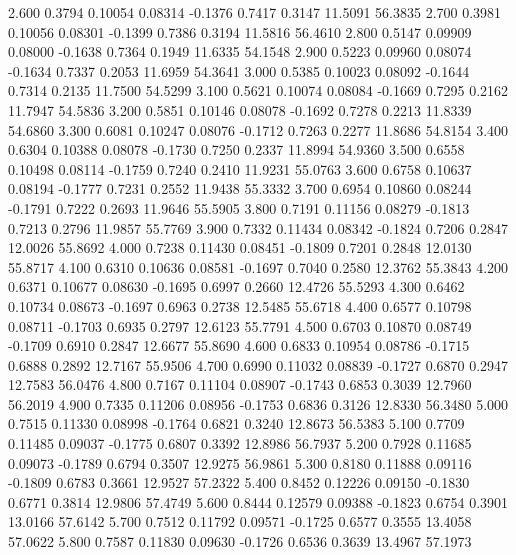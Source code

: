    2.600   0.3794   0.10054   0.08314  -0.1376   0.7417   0.3147  11.5091  56.3835
   2.700   0.3981   0.10056   0.08301  -0.1399   0.7386   0.3194  11.5816  56.4610
   2.800   0.5147   0.09909   0.08000  -0.1638   0.7364   0.1949  11.6335  54.1548
   2.900   0.5223   0.09960   0.08074  -0.1634   0.7337   0.2053  11.6959  54.3641
   3.000   0.5385   0.10023   0.08092  -0.1644   0.7314   0.2135  11.7500  54.5299
   3.100   0.5621   0.10074   0.08084  -0.1669   0.7295   0.2162  11.7947  54.5836
   3.200   0.5851   0.10146   0.08078  -0.1692   0.7278   0.2213  11.8339  54.6860
   3.300   0.6081   0.10247   0.08076  -0.1712   0.7263   0.2277  11.8686  54.8154
   3.400   0.6304   0.10388   0.08078  -0.1730   0.7250   0.2337  11.8994  54.9360
   3.500   0.6558   0.10498   0.08114  -0.1759   0.7240   0.2410  11.9231  55.0763
   3.600   0.6758   0.10637   0.08194  -0.1777   0.7231   0.2552  11.9438  55.3332
   3.700   0.6954   0.10860   0.08244  -0.1791   0.7222   0.2693  11.9646  55.5905
   3.800   0.7191   0.11156   0.08279  -0.1813   0.7213   0.2796  11.9857  55.7769
   3.900   0.7332   0.11434   0.08342  -0.1824   0.7206   0.2847  12.0026  55.8692
   4.000   0.7238   0.11430   0.08451  -0.1809   0.7201   0.2848  12.0130  55.8717
   4.100   0.6310   0.10636   0.08581  -0.1697   0.7040   0.2580  12.3762  55.3843
   4.200   0.6371   0.10677   0.08630  -0.1695   0.6997   0.2660  12.4726  55.5293
   4.300   0.6462   0.10734   0.08673  -0.1697   0.6963   0.2738  12.5485  55.6718
   4.400   0.6577   0.10798   0.08711  -0.1703   0.6935   0.2797  12.6123  55.7791
   4.500   0.6703   0.10870   0.08749  -0.1709   0.6910   0.2847  12.6677  55.8690
   4.600   0.6833   0.10954   0.08786  -0.1715   0.6888   0.2892  12.7167  55.9506
   4.700   0.6990   0.11032   0.08839  -0.1727   0.6870   0.2947  12.7583  56.0476
   4.800   0.7167   0.11104   0.08907  -0.1743   0.6853   0.3039  12.7960  56.2019
   4.900   0.7335   0.11206   0.08956  -0.1753   0.6836   0.3126  12.8330  56.3480
   5.000   0.7515   0.11330   0.08998  -0.1764   0.6821   0.3240  12.8673  56.5383
   5.100   0.7709   0.11485   0.09037  -0.1775   0.6807   0.3392  12.8986  56.7937
   5.200   0.7928   0.11685   0.09073  -0.1789   0.6794   0.3507  12.9275  56.9861
   5.300   0.8180   0.11888   0.09116  -0.1809   0.6783   0.3661  12.9527  57.2322
   5.400   0.8452   0.12226   0.09150  -0.1830   0.6771   0.3814  12.9806  57.4749
   5.600   0.8444   0.12579   0.09388  -0.1823   0.6754   0.3901  13.0166  57.6142
   5.700   0.7512   0.11792   0.09571  -0.1725   0.6577   0.3555  13.4058  57.0622
   5.800   0.7587   0.11830   0.09630  -0.1726   0.6536   0.3639  13.4967  57.1973
